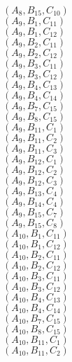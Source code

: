 \documentclass[14pt]{article}
\begin{document}
    $({A}_{8}, {B}_{15}, {C}_{10}) $ \\ 
    $({A}_{9}, {B}_{1}, {C}_{11}) $ \\ 
    $({A}_{9}, {B}_{1}, {C}_{12}) $ \\ 
    $({A}_{9}, {B}_{2}, {C}_{11}) $ \\ 
    $({A}_{9}, {B}_{2}, {C}_{12}) $ \\ 
    $({A}_{9}, {B}_{3}, {C}_{11}) $ \\ 
    $({A}_{9}, {B}_{3}, {C}_{12}) $ \\ 
    $({A}_{9}, {B}_{4}, {C}_{13}) $ \\ 
    $({A}_{9}, {B}_{4}, {C}_{14}) $ \\ 
    $({A}_{9}, {B}_{7}, {C}_{15}) $ \\ 
    $({A}_{9}, {B}_{8}, {C}_{15}) $ \\ 
    $({A}_{9}, {B}_{11}, {C}_{1}) $ \\ 
    $({A}_{9}, {B}_{11}, {C}_{2}) $ \\ 
    $({A}_{9}, {B}_{11}, {C}_{3}) $ \\ 
    $({A}_{9}, {B}_{12}, {C}_{1}) $ \\ 
    $({A}_{9}, {B}_{12}, {C}_{2}) $ \\ 
    $({A}_{9}, {B}_{12}, {C}_{3}) $ \\ 
    $({A}_{9}, {B}_{13}, {C}_{4}) $ \\ 
    $({A}_{9}, {B}_{14}, {C}_{4}) $ \\ 
    $({A}_{9}, {B}_{15}, {C}_{7}) $ \\ 
    $({A}_{9}, {B}_{15}, {C}_{8}) $ \\ 
    $({A}_{10}, {B}_{1}, {C}_{11}) $ \\ 
    $({A}_{10}, {B}_{1}, {C}_{12}) $ \\ 
    $({A}_{10}, {B}_{2}, {C}_{11}) $ \\ 
    $({A}_{10}, {B}_{2}, {C}_{12}) $ \\ 
    $({A}_{10}, {B}_{3}, {C}_{11}) $ \\ 
    $({A}_{10}, {B}_{3}, {C}_{12}) $ \\ 
    $({A}_{10}, {B}_{4}, {C}_{13}) $ \\ 
    $({A}_{10}, {B}_{4}, {C}_{14}) $ \\ 
    $({A}_{10}, {B}_{7}, {C}_{15}) $ \\ 
    $({A}_{10}, {B}_{8}, {C}_{15}) $ \\ 
    $({A}_{10}, {B}_{11}, {C}_{1}) $ \\ 
    $({A}_{10}, {B}_{11}, {C}_{2}) $ \\ 
\end{document}
